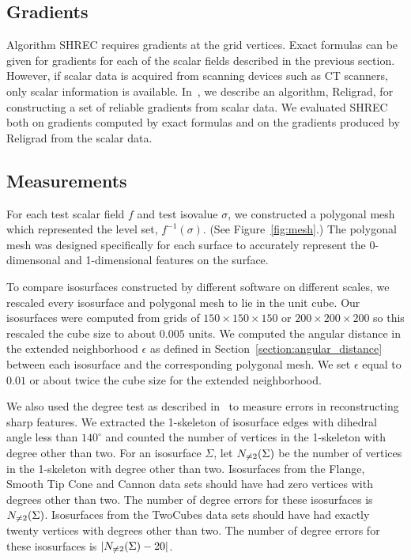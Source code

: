\subsection{Gradients}

Algorithm SHREC requires gradients at the grid vertices.
Exact formulas can be given for gradients
for each of the scalar fields described in the previous section.
However, if scalar data is acquired from scanning devices such as CT scanners,
only scalar information is available.
In~\cite{bw-crgsd-15},
we describe an algorithm, Religrad, for constructing a set 
of reliable gradients from scalar data.
We evaluated SHREC both on gradients computed by exact formulas
and on the gradients produced by Religrad from the scalar data.

\subsection{Measurements}

For each test scalar field $f$ and test isovalue $\sigma$,
we constructed a polygonal mesh which represented the level set,
$f^{-1}(\sigma)$.
(See Figure~\ref{fig:mesh}.)
The polygonal mesh was designed specifically for each surface
to accurately represent the 0-dimensonal and 1-dimensional features
on the surface.

To compare isosurfaces constructed by different software on different scales,
we rescaled every isosurface and polygonal mesh to lie in the unit cube.
Our isosurfaces were computed from grids 
of $150 \times 150 \times 150$ or $200 \times 200 \times 200$
so this rescaled the cube size to about $0.005$ units.
We computed the angular distance in the extended neighborhood $\epsilon$
as defined in Section~\ref{section:angular_distance}
between each isosurface and the corresponding polygonal mesh.
We set $\epsilon$ equal to $0.01$ or about twice the cube size
for the extended neighborhood.

We also used the degree test as described in~\cite{bw-cisec-13}
to measure errors in reconstructing sharp features.
We extracted the 1-skeleton of isosurface edges with dihedral angle 
less than $140^\circ$ and counted the number of vertices in the 1-skeleton
with degree other than two.
For an isosurface $\Sigma$,
let $N_{\neq 2}(\Sigma)$ be the number of vertices in the 1-skeleton
with degree other than two.
Isosurfaces from the Flange, Smooth Tip Cone and Cannon data sets
should have had zero vertices with degrees other than two.
The number of degree errors for these isosurfaces is $N_{\neq 2}(\Sigma)$.
Isosurfaces from the TwoCubes data sets should have had exactly
twenty vertices with degrees other than two.
The number of degree errors for these isosurfaces is $|N_{\neq 2}(\Sigma)-20|$.

